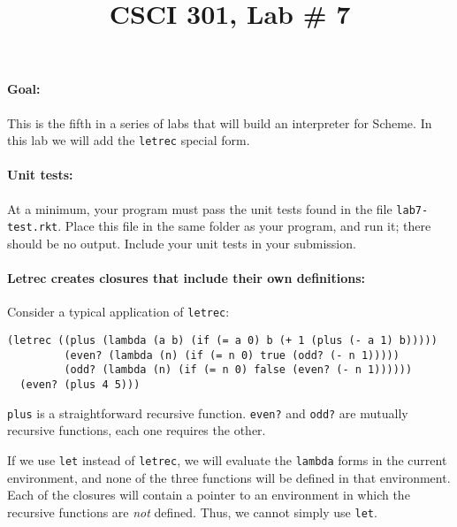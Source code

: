 \documentclass[letterpaper,12pt]{article}
\title{CSCI 301, Lab \# 7}
\author{\term}
\begin{document}
\maketitle

\paragraph{Goal:} This is the fifth in a series of labs that will build an
interpreter for Scheme.  In this lab we will add the {\tt letrec} special form.

\paragraph{Unit tests:} At a minimum, your program must pass the unit tests
found in the file \texttt{lab7-test.rkt}.  Place this file in the same folder as
your program, and run it; there should be no output.  Include your unit tests in
your submission.

\paragraph{Letrec creates closures that include their own definitions:}
Consider a typical application of \texttt{letrec}:
\begin{Verbatim}
(letrec ((plus (lambda (a b) (if (= a 0) b (+ 1 (plus (- a 1) b)))))
         (even? (lambda (n) (if (= n 0) true (odd? (- n 1)))))
         (odd? (lambda (n) (if (= n 0) false (even? (- n 1))))))
  (even? (plus 4 5)))
\end{Verbatim}
\texttt{plus} is a straightforward recursive function.  \texttt{even?} and
\texttt{odd?} are mutually recursive functions, each one requires the other.

If we use \texttt{let} instead of \texttt{letrec}, we will evaluate the
\texttt{lambda} forms in the current environment, and none of the three
functions will be defined in that environment.  Each of the closures will
contain a pointer to an environment in which the recursive functions are
\emph{not} defined.  Thus, we cannot simply use \texttt{let}.
\end{document}
